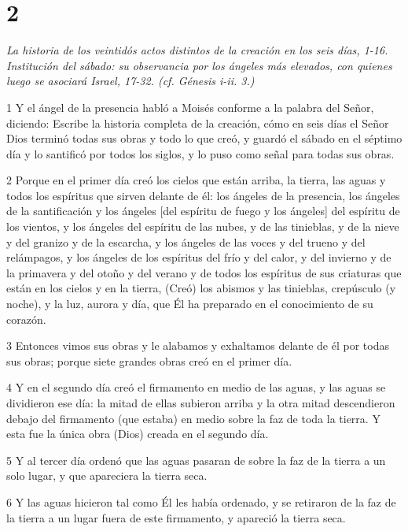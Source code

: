 \chapter{2}

\par \textit{La historia de los veintidós actos distintos de la creación en los seis días, 1-16. Institución del sábado: su observancia por los ángeles más elevados, con quienes luego se asociará Israel, 17-32. (cf. Génesis i-ii. 3.)}

\par 1 Y el ángel de la presencia habló a Moisés conforme a la palabra del Señor, diciendo: Escribe la historia completa de la creación, cómo en seis días el Señor Dios terminó todas sus obras y todo lo que creó, y guardó el sábado en el séptimo día y lo santificó por todos los siglos, y lo puso como señal para todas sus obras.
\par 2 Porque en el primer día creó los cielos que están arriba, la tierra, las aguas y todos los espíritus que sirven delante de él: los ángeles de la presencia, los ángeles de la santificación y los ángeles [del espíritu de fuego y los ángeles] del espíritu de los vientos, y los ángeles del espíritu de las nubes, y de las tinieblas, y de la nieve y del granizo y de la escarcha, y los ángeles de las voces y del trueno y del relámpagos, y los ángeles de los espíritus del frío y del calor, y del invierno y de la primavera y del otoño y del verano y de todos los espíritus de sus criaturas que están en los cielos y en la tierra, (Creó) los abismos y las tinieblas, crepúsculo (y noche), y la luz, aurora y día, que Él ha preparado en el conocimiento de su corazón.
\par 3 Entonces vimos sus obras y le alabamos y exhaltamos delante de él por todas sus obras; porque siete grandes obras creó en el primer día.
\par 4 Y en el segundo día creó el firmamento en medio de las aguas, y las aguas se dividieron ese día: la mitad de ellas subieron arriba y la otra mitad descendieron debajo del firmamento (que estaba) en medio sobre la faz de toda la tierra. Y esta fue la única obra (Dios) creada en el segundo día.
\par 5 Y al tercer día ordenó que las aguas pasaran de sobre la faz de la tierra a un solo lugar, y que apareciera la tierra seca.
\par 6 Y las aguas hicieron tal como Él les había ordenado, y se retiraron de la faz de la tierra a un lugar fuera de este firmamento, y apareció la tierra seca.
